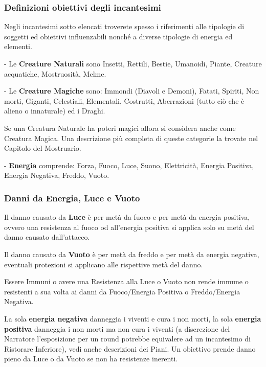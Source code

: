 \begin{multicols}{2}
\subsubsection{Definizioni obiettivi degli incantesimi}\label{magiedefinizioniobiettivi}

Negli incantesimi sotto elencati troverete spesso i riferimenti alle tipologie di soggetti ed obiettivi influenzabili nonché a diverse tipologie di energia ed elementi.

- Le \textbf{Creature Naturali} sono Insetti, Rettili, Bestie, Umanoidi, Piante, Creature acquatiche, Mostruosità, Melme.

- Le \textbf{Creature Magiche} sono: Immondi (Diavoli e Demoni), Fatati, Spiriti, Non morti, Giganti, Celestiali, Elementali, Costrutti, Aberrazioni (tutto ciò che è alieno o innaturale) ed i Draghi.

Se una Creatura Naturale ha poteri magici allora si considera anche come Creatura Magica. Una descrizione più completa di queste categorie la trovate nel Capitolo del Mostruario.

- \textbf{Energia} comprende: Forza, Fuoco, Luce, Suono, Elettricità, Energia Positiva, Energia Negativa, Freddo, Vuoto.\label{elencoenergia}\hypertarget{elencoenergia}{}

\subsubsection{Danni da Energia, Luce e Vuoto}

Il danno causato da \textbf{Luce} è per metà da fuoco e per metà da energia positiva, ovvero una resistenza al fuoco od all'energia positiva si applica solo su metà del danno causato dall'attacco.

Il danno causato da \textbf{Vuoto} è per metà da freddo e per metà da energia negativa, eventuali protezioni si applicano alle rispettive metà del danno.

Essere Immuni o avere una Resistenza alla Luce o Vuoto non rende immune o resistenti a sua volta ai danni da Fuoco/Energia Positiva o Freddo/Energia Negativa.

La sola \textbf{energia negativa} danneggia i viventi e cura i non morti, la sola \textbf{energia positiva} danneggia i non morti ma non cura i viventi (a discrezione del Narratore l'esposizione per un round potrebbe equivalere ad un incantesimo di Ristorare Inferiore), vedi anche descrizioni dei Piani. Un obiettivo prende danno pieno da Luce o da Vuoto se non ha resistenze inerenti.


\end{multicols}

